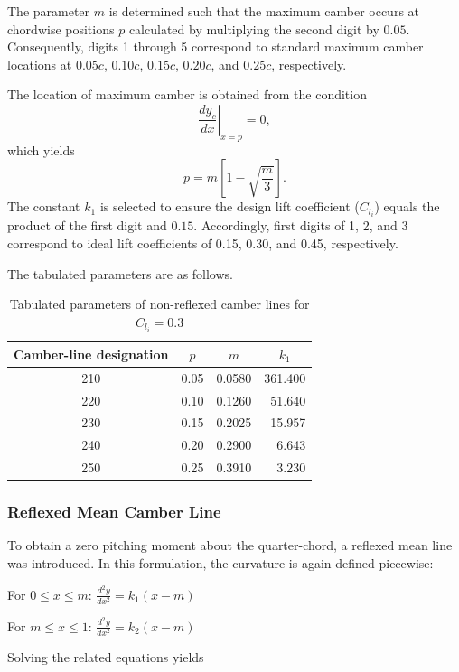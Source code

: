 The parameter $m$ is determined such that the maximum camber occurs at chordwise positions $p$ calculated by multiplying the second digit by $0.05$. 
Consequently, 
digits 1 through 5 correspond to standard maximum camber locations at $0.05c$, $0.10c$, $0.15c$, $0.20c$, and $0.25c$, respectively.

The location of maximum camber is obtained from the condition
\[
\left.
\frac{dy_c}{dx}
\right|_{x = p} = 0,
\]
which yields
\[
p
=
m
\left[
1 - \sqrt{\frac{m}{3}}
\right].
\]
The constant $k_1$ is selected to ensure the design lift coefficient ($C_{l_i}$) equals the product of the first digit and $0.15$. 
Accordingly, 
first digits of 1, 2, and 3 correspond to ideal lift coefficients of 0.15, 0.30, and 0.45, respectively.

The tabulated parameters are as follows.
\begin{table}[h!]
\centering

\label{tab:naca5_nonreflex}
\begin{tabular}{|c|c|c|r|}
\hline
Camber-line designation & $p$ & $m$ & \multicolumn{1}{c|}{$k_1$} \\
\hline
210 & 0.05 & 0.0580 & 361.400 \\
220 & 0.10 & 0.1260 & 51.640 \\
230 & 0.15 & 0.2025 & 15.957 \\
240 & 0.20 & 0.2900 & 6.643 \\
250 & 0.25 & 0.3910 & 3.230 \\
\hline
\end{tabular}
\caption{Tabulated parameters of non-reflexed camber lines 
for $C_{l_i}=0.3$}
\end{table}


\subsubsection*{Reflexed Mean Camber Line}

To obtain a zero pitching moment about the quarter-chord, 
a reflexed mean line was introduced. 
In this formulation, the curvature is again defined piecewise:

For $0 \le x \le m$:\quad
$
\displaystyle \frac{d^2 y}{dx^2} = k_1 (x - m)
$

For $m \le x \le 1$:\quad
$
\displaystyle \frac{d^2 y}{dx^2} = k_2 (x - m)
$

Solving the related equations yields


